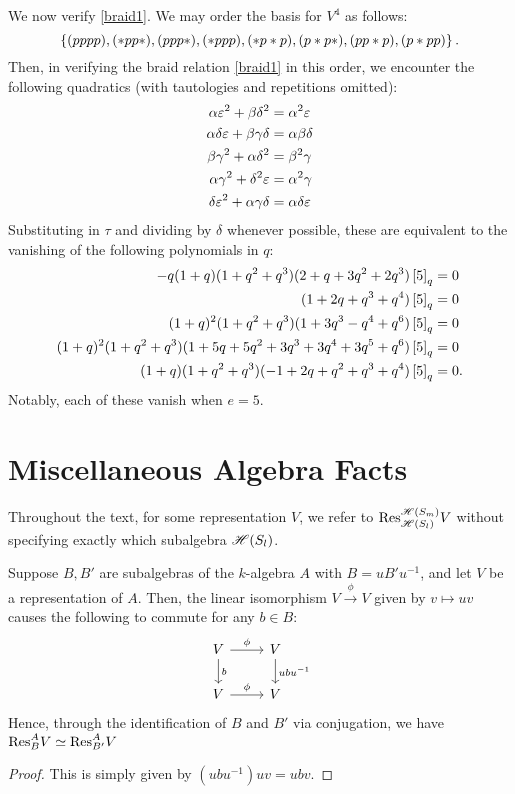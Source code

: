 \documentclass{amsart}
\begin{document}
\vspace{7pt}
We now verify \eqref{braid1}.
We may order the basis for $V^4$ as follows:
\[
  \left\{ (pppp),(*pp*),(ppp*),(*ppp),(*p*p),(p*p*),(pp*p),(p*pp) \right\}.
\]
Then, in verifying the braid relation \eqref{braid1} in this order, we encounter the following quadratics (with tautologies and repetitions omitted):
\begin{align*}
    \alpha\varepsilon^2 + \beta\delta^2 &= \alpha^2 \varepsilon\\
    \alpha\delta\varepsilon + \beta\gamma\delta &= \alpha\beta\delta\\
    \beta\gamma^2 + \alpha\delta^2 &= \beta^2\gamma\\
    \alpha\gamma^2 + \delta^2\varepsilon &= \alpha^2\gamma\\
    \delta\varepsilon^2 + \alpha\gamma\delta &= \alpha\delta\varepsilon
\end{align*}
Substituting in $\tau$ and dividing by $\delta$ whenever possible, these are equivalent to the vanishing of the following polynomials in $q$:
\begin{align*}
  -q (1 + q) (1 + q^2 + q^3) (2 + q + 3 q^2 + 2 q^3) \left[ 5 \right]_q &= 0\\
  (1 + 2 q + q^3 + q^4) \left[ 5 \right]_q &= 0\\
  (1+q)^2 (1+q^2+q^3) (1+3q^3 - q^4 + q^6)\left[ 5 \right]_q &= 0\\
  (1+q)^2 (1+q^2+q^3) (1+5q+5q^2+3q^3+3q^4+3q^5+q^6)\left[ 5 \right]_q &= 0\\
  (1+q) (1+q^2+q^3) (-1+2q+q^2+q^3+q^4)\left[ 5 \right]_q &= 0.
\end{align*}
Notably, each of these vanish when $e = 5$.

\section{Miscellaneous Algebra Facts}
Throughout the text, for some representation $V$, we refer to $\text{Res}_{\mathscr{H}(S_{l})}^{\mathscr{H}(S_m)} V$ without specifying exactly which subalgebra $\mathscr{H}(S_{l})$.
\begin{proposition}
  Suppose $B,B'$ are subalgebras of the $k$-algebra $A$ with $B = uB'u^{-1}$, and let $V$ be a representation of $A$.
  Then, the linear isomorphism $V \xrightarrow{\phi} V$ given by $v \mapsto uv$ causes the following to commute for any $b \in B$:
  \[
    \begin{tikzcd}
      V \arrow[r,"\phi"] \arrow[d,"b"] & V \arrow[d,"ubu^{-1}"]\\
      V \arrow[r,"\phi"] & V
    \end{tikzcd}
  \]
  Hence, through the identification of $B$ and $B'$ via conjugation, we have $\text{Res}_{B}^A V \simeq \text{Res}_{B'}^A V$
\end{proposition}
\begin{proof}
  This is simply given by $(ubu^{-1})uv = ubv$.
\end{proof}
\end{document}
